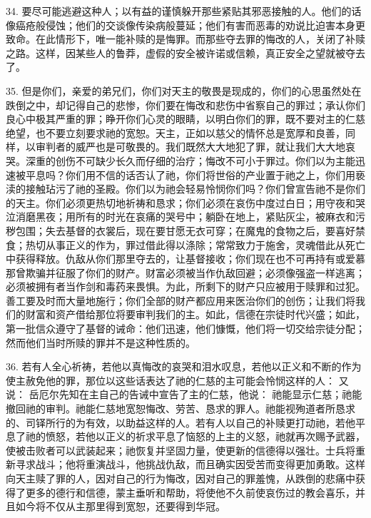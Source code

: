 34. 要尽可能逃避这种人；以有益的谨慎躲开那些紧贴其邪恶接触的人。他们的话像癌疮般侵蚀；他们的交谈像传染病般蔓延；他们有害而恶毒的劝说比迫害本身更致命。在此情形下，唯一能补赎的是悔罪。而那些夺去罪的悔改的人，关闭了补赎之路。这样，因某些人的鲁莽，虚假的安全被许诺或信赖，真正安全之望就被夺去了。\par

35. 但是你们，亲爱的弟兄们，你们对天主的敬畏是现成的，你们的心思虽然处在跌倒之中，却记得自己的悲惨，你们要在悔改和悲伤中省察自己的罪过；承认你们良心中极其严重的罪；睁开你们心灵的眼睛，以明白你们的罪，既不要对主的仁慈绝望，也不要立刻要求祂的宽恕。天主，正如以慈父的情怀总是宽厚和良善，同样，以审判者的威严也是可敬畏的。我们既然大大地犯了罪，就让我们大大地哀哭。深重的创伤不可缺少长久而仔细的治疗；悔改不可小于罪过。你们以为主能迅速被平息吗？你们用不信的话否认了祂，你们将世俗的产业置于祂之上，你们用亵渎的接触玷污了祂的圣殿。你们以为祂会轻易怜悯你们吗？你们曾宣告祂不是你们的天主。你们必须更热切地祈祷和恳求；你们必须在哀伤中度过白日；用守夜和哭泣消磨黑夜；用所有的时光在哀痛的哭号中；躺卧在地上，紧贴灰尘，被麻衣和污秽包围；失去基督的衣裳后，现在要甘愿无衣可穿；在魔鬼的食物之后，要喜好禁食；热切从事正义的作为，罪过借此得以涤除；常常致力于施舍，灵魂借此从死亡中获得释放。仇敌从你们那里夺去的，让基督接收；你们现在也不可再持有或爱慕那曾欺骗并征服了你们的财产。财富必须被当作仇敌回避；必须像强盗一样逃离；必须被拥有者当作剑和毒药来畏惧。为此，所剩下的财产只应被用于赎罪和过犯。善工要及时而大量地施行；你们全部的财产都应用来医治你们的创伤；让我们将我们的财富和资产借给那位将要审判我们的主。如此，信德在宗徒时代兴盛；如此，第一批信众遵守了基督的诫命：他们迅速，他们慷慨，他们将一切交给宗徒分配；然而他们当时所赎的罪并不是这种性质的。\par

36. 若有人全心祈祷，若他以真悔改的哀哭和泪水叹息，若他以正义和不断的作为使主赦免他的罪，那位以这些话表达了祂的仁慈的主可能会怜悯这样的人： 又说： 岳厄尔先知在主自己的告诫中宣告了主的仁慈，他说： 祂能显示仁慈；祂能撤回祂的审判。祂能仁慈地宽恕悔改、劳苦、恳求的罪人。祂能视殉道者所恳求的、司铎所行的为有效，以助益这样的人。若有人以自己的补赎更打动祂，若他平息了祂的愤怒，若他以正义的祈求平息了恼怒的上主的义怒，祂就再次赐予武器，使被击败者可以武装起来；祂恢复并坚固力量，使更新的信德得以强壮。士兵将重新寻求战斗；他将重演战斗，他挑战仇敌，而且确实因受苦而变得更加勇敢。这样向天主赎了罪的人，因对自己的行为悔改，因对自己的罪羞愧，从跌倒的悲痛中获得了更多的德行和信德，蒙主垂听和帮助，将使他不久前使哀伤过的教会喜乐，并且如今将不仅从主那里得到宽恕，还要得到华冠。\par

